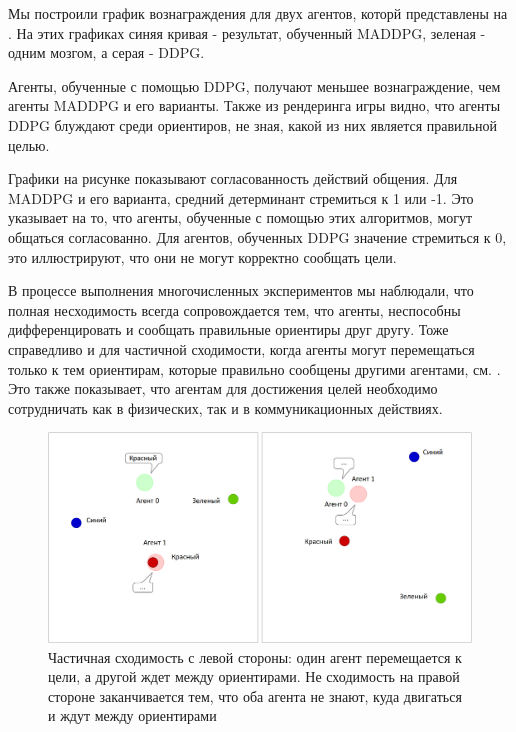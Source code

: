 Мы построили график вознаграждения для двух агентов, которй представлены на . На этих графиках синяя кривая - результат, обученный MADDPG, зеленая - одним мозгом, а серая - DDPG.

Агенты, обученные с помощью DDPG, получают меньшее вознаграждение, чем агенты MADDPG и его варианты. Также из рендеринга игры видно, что агенты DDPG блуждают среди ориентиров, не зная, какой из них является правильной целью.

Графики на рисунке  показывают согласованность действий общения. Для MADDPG и его варианта, средний детерминант стремиться к 1 или -1. Это указывает на то, что агенты, обученные с помощью этих алгоритмов, могут общаться согласованно. Для агентов, обученных DDPG значение стремиться к 0, это иллюстрируют, что они не могут корректно сообщать цели.

В процессе выполнения многочисленных экспериментов мы наблюдали, что полная несходимость всегда сопровождается тем, что агенты, неспособны дифференцировать и сообщать правильные ориентиры друг другу. Тоже справедливо и для частичной сходимости, когда агенты могут перемещаться только к тем ориентирам, которые правильно сообщены другими агентами, см. . Это также показывает, что агентам для достижения целей необходимо сотрудничать как в физических, так и в коммуникационных действиях.

\begin{figure}[ht!]
	\center
	\includegraphics [scale=0.45] {my_folder/images/ch5/results-sr-non-convergency.png}
	\caption{Частичная сходимость с левой стороны: один агент перемещается к цели, а другой ждет между ориентирами. Не сходимость на правой стороне заканчивается тем, что оба агента не знают, куда двигаться и ждут между ориентирами}
	\label{fig:result-sr-non-convergency}
\end{figure}

